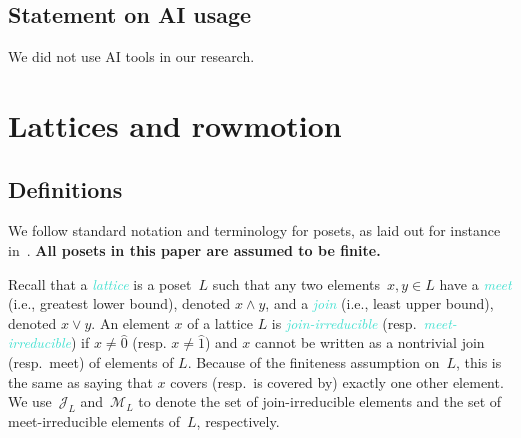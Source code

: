 \documentclass[11pt]{amsart}
\newcommand{\dfn}[1]{\textcolor{Turquoise}{\emph{#1}}}
\theoremstyle{definition}
\begin{document}
\subsection*{Statement on AI usage}

We did not use AI tools in our research.

\section{Lattices and rowmotion} \label{sec:background}

\subsection{Definitions} 

We follow standard notation and terminology for posets, as laid out for instance in~\cite[Chapter~3]{stanley2012ec1}. {\bf All posets in this paper are assumed to be finite.}

Recall that a \dfn{lattice} is a poset~$L$ such that any two elements~$x,y\in L$ have a \dfn{meet} (i.e., greatest lower bound), denoted $x\wedge y$, and a \dfn{join} (i.e., least upper bound), denoted $x\vee y$. An element $x$ of a lattice $L$ is \dfn{join-irreducible} (resp.~\dfn{meet-irreducible}) if $x\neq\hat 0$ (resp. $x\neq\hat 1$) and $x$
cannot be written as a nontrivial join (resp.~meet) of elements of $L$. Because of the finiteness assumption on~$L$, this is the same as saying that $x$ covers (resp.~is covered by) exactly one other element. We use~$\mathcal J_L$ and~$\mathcal M_L$ to denote the set of join-irreducible elements and the set of meet-irreducible elements of~$L$, respectively.
\end{document}
